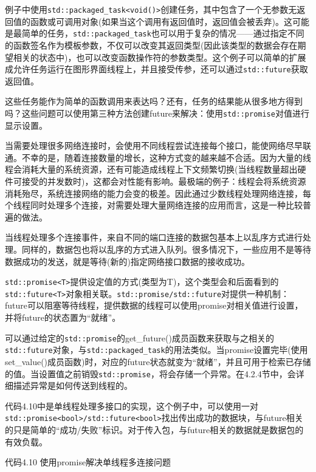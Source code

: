 例子中使用\texttt{std::packaged\_task<void()>}创建任务，其中包含了一个无参数无返回值的函数或可调用对象(如果当这个调用有返回值时，返回值会被丢弃)。这可能是最简单的任务，\texttt{std::packaged\_task}也可以用于复杂的情况——通过指定不同的函数签名作为模板参数，不仅可以改变其返回类型(因此该类型的数据会存在期望相关的状态中)，也可以改变函数操作符的参数类型。这个例子可以简单的扩展成允许任务运行在图形界面线程上，并且接受传参，还可以通过\texttt{std::future}获取返回值。

这些任务能作为简单的函数调用来表达吗？还有，任务的结果能从很多地方得到吗？这些问题可以使用第三种方法创建future来解决：使用\texttt{std::promise}对值进行显示设置。


当需要处理很多网络连接时，会使用不同线程尝试连接每个接口，能使网络尽早联通。不幸的是，随着连接数量的增长，这种方式变的越来越不合适。因为大量的线程会消耗大量的系统资源，还有可能造成线程上下文频繁切换(当线程数量超出硬件可接受的并发数时)，这都会对性能有影响。最极端的例子：线程会将系统资源消耗殆尽，系统连接网络的能力会变的极差。因此通过少数线程处理网络连接，每个线程同时处理多个连接，对需要处理大量网络连接的应用而言，这是一种比较普遍的做法。

当线程处理多个连接事件，来自不同的端口连接的数据包基本上以乱序方式进行处理。同样的，数据包也将以乱序的方式进入队列。很多情况下，一些应用不是等待数据成功的发送，就是等待(新的)指定网络接口数据的接收成功。

\texttt{std::promise<T>}提供设定值的方式(类型为T)，这个类型会和后面看到的\texttt{std::future<T>}对象相关联。\texttt{std::promise/std::future}对提供一种机制：future可以阻塞等待线程，提供数据的线程可以使用promise对相关值进行设置，并将future的状态置为“就绪”。

可以通过给定的\texttt{std::promise}的get\_future()成员函数来获取与之相关的\texttt{std::future}对象，与\texttt{std::packaged\_task}的用法类似。当promise设置完毕(使用set\_value()成员函数)时，对应的future状态就变为“就绪”，并且可用于检索已存储的值。当设置值之前销毁\texttt{std::promise}，将会存储一个异常。在4.2.4节中，会详细描述异常是如何传送到线程的。

代码4.10中是单线程处理多接口的实现，这个例子中，可以使用一对\texttt{std::promise<bool>/std::future<bool>}找出传出成功的数据块，与future相关的只是简单的“成功/失败”标识。对于传入包，与future相关的数据就是数据包的有效负载。

代码4.10 使用promise解决单线程多连接问题

